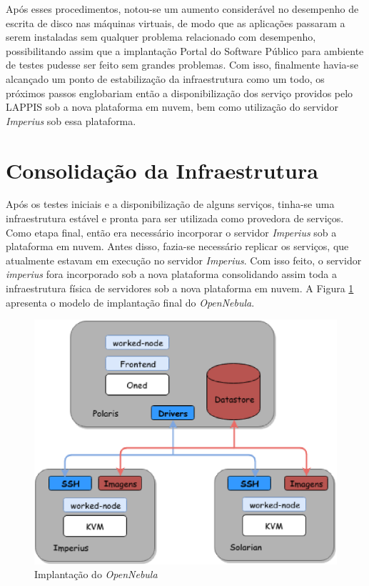 \begin{apendicesenv}
Após esses procedimentos, notou-se um aumento considerável no desempenho de escrita de disco nas máquinas virtuais, de modo que as aplicações passaram a serem instaladas sem qualquer problema relacionado com desempenho, possibilitando assim que a implantação Portal do Software Público para ambiente de testes pudesse ser feito sem grandes problemas. Com isso, finalmente havia-se alcançado um ponto de estabilização da infraestrutura como um todo, os próximos passos englobariam então a disponibilização dos serviço providos pelo LAPPIS sob a nova plataforma em nuvem, bem como utilização do servidor \textit{Imperius} sob essa plataforma.  

\section{Consolidação da Infraestrutura}
Após os testes iniciais e a disponibilização de alguns serviços, tinha-se uma infraestrutura estável e pronta para ser utilizada como provedora de serviços. Como etapa final, então era necessário incorporar o servidor \textit{Imperius} sob a plataforma em nuvem. Antes disso, fazia-se necessário replicar os serviços, que atualmente estavam em execução no servidor \textit{Imperius}. Com isso feito, o servidor \textit{imperius} fora incorporado sob a nova plataforma consolidando assim toda a infraestrutura física de servidores sob a nova plataforma em nuvem. A Figura \ref{fig:opennebula_lappis} apresenta o modelo de implantação final do \textit{OpenNebula}.

\begin{figure}[!h]
\centering
\includegraphics [keepaspectratio=true,scale=0.53]{figuras/cloud_implation.eps}
\caption{Implantação do \textit{OpenNebula}}
\label{fig:opennebula_lappis}
\end{figure}



\end{apendicesenv}
